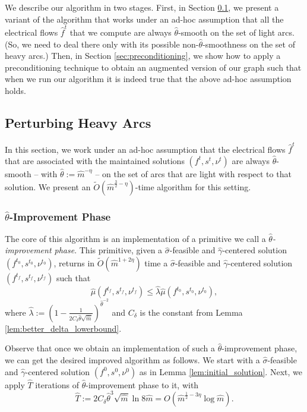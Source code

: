 \documentclass[11pt, letterpaper]{article}
\newcommand{\cdelta}{C_{\delta}}
\newcommand{\tO}[1]{\widetilde{O}(#1)}
\newcommand{\hm}{\widehat{m}}
\newcommand{\hT}{\widehat{T}}
\newcommand{\hmu}{\hat{\mu}}
\newcommand{\hgamma}{\hat{\gamma}}
\newcommand{\htheta}{\hat{\theta}}
\newcommand{\hlambda}{\hat{\lambda}}
\newcommand{\vnu}{\boldsymbol{\mathit{\nu}}}
\newcommand{\hvsigma}{\boldsymbol{\mathit{\hat{\sigma}}}}
\newcommand{\ff}{\boldsymbol{\mathit{f}}}
\newcommand{\hff}{\boldsymbol{\mathit{\hat{f}}}}
\renewcommand{\ss}{\boldsymbol{\mathit{s}}}
\begin{document}
We  describe our algorithm in two stages. First, in Section \ref{sec:heavy}, we present a variant of the algorithm that works under an ad-hoc assumption that all the electrical flows $\hff^t$ that we compute are always $\htheta$-smooth on the set of light arcs. (So, we need to deal there only with its possible non-$\htheta$-smoothness on the set of heavy arcs.) Then, in Section \ref{sec:preconditioning}, we show how to apply a preconditioning technique to obtain an augmented version of our graph such that when we run our algorithm it is indeed true that the above ad-hoc assumption holds. 
 \subsection{Perturbing Heavy Arcs}\label{sec:heavy}


In this section, we work under an ad-hoc assumption that the electrical flows $\hff^t$ that are associated with the maintained solutions $(\ff^t,\ss^t,\vnu^t)$ are always $\htheta$-smooth -- with $\htheta:=\hm^{-\eta}$ -- on the set of arcs that are light with respect to that solution. We present an $\tO{\hm^{\frac{3}{2}-\eta}}$-time algorithm for this setting. 

\subsubsection*{$\htheta$-Improvement Phase}

The core of this algorithm is an implementation of a primitive we call a {\em $\htheta$-improvement phase}. This primitive, given a $\hvsigma$-feasible and $\hgamma$-centered solution $(\ff^{t_0},\ss^{t_0},\vnu^{t_0})$, returns in $\tO{\hm^{1+2\eta}}$ time a $\hvsigma$-feasible and $\hgamma$-centered solution $(\ff^{t_f},\ss^{t_f},\vnu^{t_f})$ such that 
\begin{equation}\label{eq:theta_improvement_progress}
\hmu(\ff^{t_f},\ss^{t_f},\vnu^{t_f})\leq \hlambda\hmu(\ff^{t_0},\ss^{t_0},\vnu^{t_0}),
\end{equation}
where $\hlambda:=\left(1-\frac{1}{2\cdelta \htheta \sqrt{\hm}}\right)^{\htheta^{-2}}$ and $\cdelta$ is the constant from Lemma \ref{lem:better_delta_lowerbound}. 

Observe that once we obtain an implementation of such a $\htheta$-improvement phase, we can get the desired improved algorithm as follows. We start with a $\hvsigma$-feasible and $\hgamma$-centered solution $(\ff^0,\ss^0,\vnu^0)$ as in Lemma \ref{lem:initial_solution}. Next, we apply $\hT$ iterations of $\htheta$-improvement phase to it, with
\begin{equation}\label{eq:theta_improvement_overall_hT}
\hT:=2\cdelta \htheta^{3}\sqrt{\hm} \ln 8\hm = O(\hm^{\frac{1}{2}-3\eta}\log \hm).
\end{equation}
\end{document}
